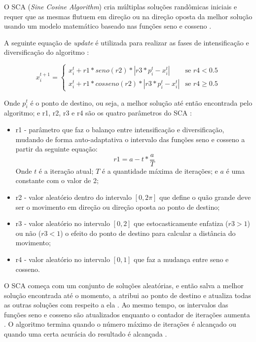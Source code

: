 O SCA (\textit{Sine Cosine Algorithm}) cria múltiplas soluções randômicas iniciais e requer que as mesmas flutuem em direção ou na direção oposta da melhor solução usando um modelo matemático baseado nas funções seno e cosseno \cite{mirjalili}.

A seguinte equação de \textit{update} é utilizada para realizar as fases de intensificação e diversificação do algoritmo \cite{mirjalili}:

\begin{equation}
x_i^{t+1} = 
\begin{cases}
    x_i^t + r1 * seno(r2) * |r3 * p_i^t - x_i^t|    & \text{se $r4 < 0.5$}\\
    x_i^t + r1 * cosseno(r2) * |r3 * p_i^t - x_i^t| & \text{se $r4 \geq 0.5$}
\end{cases}
\end{equation}

Onde $p_i^t$ é o ponto de destino, ou seja, a melhor solução até então encontrada pelo algoritmo; e r1, r2, r3 e r4 são os quatro parâmetros do SCA \cite{mirjalili}:

\begin{itemize}
    \item r1 - parâmetro que faz o balanço entre intensificação e diversificação, mudando de forma auto-adaptativa o intervalo das funções seno e cosseno a partir da seguinte equação:
    \begin{equation}
        r1 = a - t * \frac{a}{T}
    \end{equation}
    Onde $t$ é a iteração atual; $T$ é a quantidade máxima de iterações; e $a$ é uma constante com o valor de 2;
    \item r2 - valor aleatório dentro do intervalo $[0, 2\pi]$ que define o quão grande deve ser o movimento em direção ou direção oposta ao ponto de destino;
    \item r3 - valor aleatório no intervalo $[0, 2]$ que estocasticamente enfatiza ($r3 > 1$) ou não ($r3 < 1$) o efeito do ponto de destino para calcular a distância do movimento;
    \item r4 - valor aleatório no intervalo $[0, 1]$ que faz a mudança entre seno e cosseno.
\end{itemize}

O SCA começa com um conjunto de soluções aleatórias, e então salva a melhor solução encontrada até o momento, a atribui ao ponto de destino e atualiza todas as outras soluções com respeito a ela \cite{mirjalili}. Ao mesmo tempo, os intervalos das funções seno e cosseno são atualizados enquanto o contador de iterações aumenta \cite{mirjalili}. O algoritmo termina quando o número máximo de iterações é alcançado ou quando uma certa acurácia do resultado é alcançada \cite{mirjalili}.

